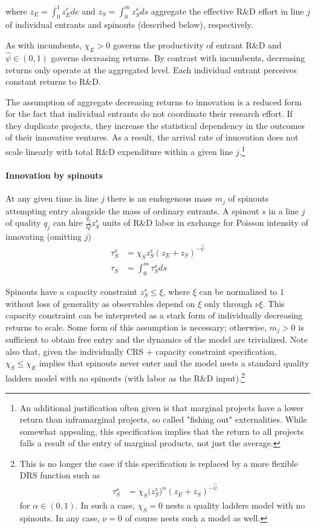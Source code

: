 \documentclass[12pt,english]{article}
\theoremstyle{remark}
\begin{document}
where $z_E = \int_0^1 z_E^e de$ and $z_S = \int_0^{m} z_S^s ds$ aggregate the effective R\&D effort in line $j$ of individual entrants and spinouts (described below), respectively. 

As with incumbents, $\chi_E > 0$ governs the productivity of entrant R\&D and $\hat{\psi} \in (0,1)$ governs decreasing returns. By contrast with incumbents, decreasing returns only operate at the aggregated level. Each individual entrant perceives constant returns to R\&D. 

The assumption of aggregate decreasing returns to innovation is a reduced form for the fact that individual entrants do not coordinate their research effort. If they duplicate projects, they increase the statistical dependency in the outcomes of their innovative ventures. As a result, the arrival rate of innovation does not scale linearly with total R\&D expenditure within a given line $j$.\footnote{An additional justification often given is that marginal projects have a lower return than inframarginal projects, so called "fishing out" externalities. While somewhat appealing, this specification implies that the return to all projects falls a result of the entry of marginal products, not just the average.}

\paragraph{Innovation by spinouts}

At any given time in line $j$ there is an endogenous mass $m_j$ of spinouts attempting entry alongside the mass of ordinary entrants. A spinout $s$ in a line $j$ of quality $q_j$ can hire $ \frac{q_j}{Q} z_S^s$ units of R\&D labor in exchange for Poisson intensity of innovating (omitting $j$)
\begin{align}
\tau_S^s &= \chi_S z_S^s (z_E+ z_S)^{-\hat{\psi}}\label{spinout_entry_rate_eq} \\
\tau_S &= \int_0^m \tau_S^s ds \nonumber
\end{align}

Spinouts have a capacity constraint $z_S^s \le \xi$, where $\xi$ can be normalized to $1$ without loss of generality as observables depend on $\xi$ only through $\nu \xi$. This capacity constraint can be interpreted as a stark form of individually decreasing returns to scale. Some form of this assumption is necessary; otherwise, $m_j > 0$ is sufficient to obtain free entry and the dynamics of the model are trivialized. Note also that, given the individually CRS + capacity constraint specification, $\chi_S \le \chi_E$ implies that spinouts never enter and the model nests a standard quality ladders model with no spinouts (with labor as the R\&D input).\footnote{This is no longer the case if this specification is replaced by a more flexible DRS function such as 
	\begin{align}
	\tau_S^s &= \chi_S \Big(z_S^s\Big)^{\alpha} (z_E+ z_S)^{-\hat{\psi}} \nonumber
	\end{align}
	for $\alpha \in (0,1)$. In such a case, $\chi_S = 0$ nests a quality ladders model with no spinouts. In any case, $\nu = 0$ of course nests such a model as well.}
\end{document}
